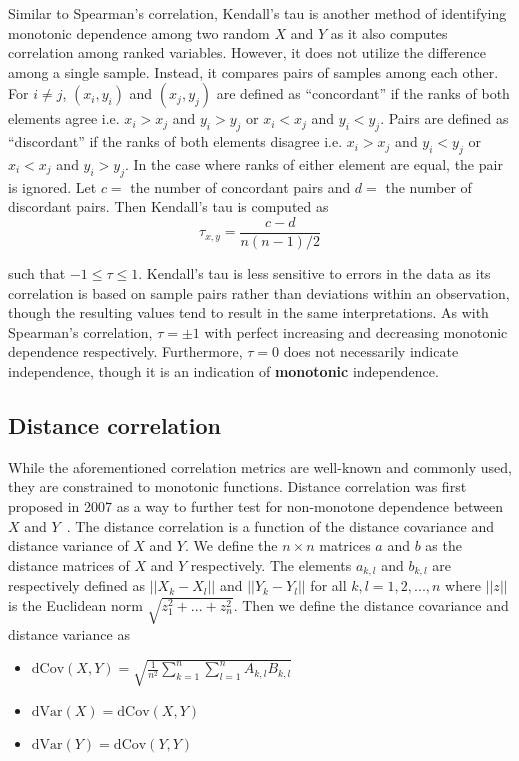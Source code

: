 Similar to Spearman's correlation, Kendall's tau is another method of
identifying monotonic dependence among two random $X$ and $Y$ as it also
computes correlation among ranked variables. However, it does not utilize the
difference among a single sample. Instead, it compares pairs of samples among
each other. For $i\not=j$, $(x_i,y_i)$ and $(x_j,y_j)$ are defined as
``concordant'' if the ranks of both elements agree i.e. $x_i > x_j$ and $y_i >
y_j$ or $x_i < x_j$ and $y_i < y_j$. Pairs are defined as ``discordant'' if the
ranks of both elements disagree i.e. $x_i > x_j$ and $y_i < y_j$ or $x_i < x_j$
and $y_i > y_j$. In the case where ranks of either element are equal, the pair
is ignored. Let $c=$ the number of concordant pairs and $d=$ the number of
discordant pairs. Then Kendall's tau is computed as 
$$\tau_{x,y}=\frac{c-d}{n(n-1)/2}$$

\noindent such that $-1 \leq \tau \leq 1$. Kendall's tau is less sensitive to 
errors in 
the data as its correlation is
based on sample pairs rather than deviations within an observation, though the
resulting values tend to result in the same interpretations. As with Spearman's
correlation, $\tau=\pm1$ with perfect increasing and decreasing monotonic
dependence respectively. Furthermore, $\tau=0$ does not necessarily indicate
independence, though it is an indication of \textbf{monotonic} independence.

\subsection{Distance correlation}

While the aforementioned correlation metrics are well-known and commonly used, 
they are constrained to monotonic functions. Distance correlation was first 
proposed in 2007 as a way to further test for non-monotone dependence between 
$X$ and $Y$~\cite{szekely2007}. The distance correlation is a function of the 
distance covariance and distance variance of $X$ and $Y$. We define the 
$n\times n$ matrices $a$ and $b$ as the distance matrices of $X$ and $Y$ 
respectively. The elements $a_{k,l}$ and $b_{k,l}$ are respectively defined as 
$||X_k-X_l||$ and $||Y_k-Y_l||$ for all $k,l=1,2,...,n$ where $||z||$ is the 
Euclidean norm $\sqrt{z_1^2+...+z_n^2}$. Then we define the distance covariance 
and distance variance as 

\tablespacing
\begin{itemize}
	\item $\mathrm{dCov}(X,Y) = \sqrt{\frac{1}{n^2} \sum\limits_{k=1}^{n} 
	\sum\limits_{l=1}^{n} A_{k,l} B_{k,l}}$
	\item $\mathrm{dVar}(X) = \mathrm{dCov}(X,Y)$
	\item $\mathrm{dVar}(Y) = \mathrm{dCov}(Y,Y)$
\end{itemize}
\bodyspacing

